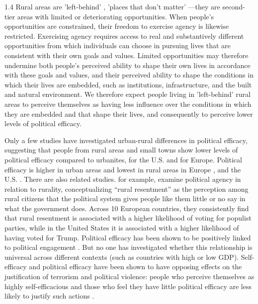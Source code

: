 \documentclass[10pt, letterpaper]{article}
\begin{document}
\begin{spacing}{1.4}
Rural areas are 'left-behind' \citep{ulrich2021people}, 'places that don't matter' \citep{rodriguez2018revenge}%
---they are second-tier areas with limited or deteriorating opportunities. 
When people's opportunities are constrained, their freedom to exercise agency is likewise restricted. Exercising agency requires access to real and substantively different opportunities from which individuals can choose in pursuing lives that are consistent with their own goals and values. Limited opportunities may therefore undermine both people's perceived ability to shape their own lives in
accordance with these goals and values, and their perceived ability to shape the conditions in which their lives are embedded, such as institutions, infrastructure, and the built and natural environment.
We therefore expect people living in 'left-behind' rural areas to perceive themselves as having less influence over the conditions in which they are embedded and that shape their lives, and consequently to perceive lower levels
of political efficacy. %
 
Only a few studies have investigated urban-rural differences in political efficacy, suggesting that people from rural areas and small towns show lower levels of political efficacy compared to urbanites, \citep[e.g.,][]{rowland2024political} for the U.S. and \citet[e.g.,][]{luukkonen2022urbanisation} for Europe.
Political efficacy is higher in urban areas and lowest in
rural areas in Europe \citep{garcia2024they,luukkonen2022urbanisation}, and the U.S. \citep{rowland2024political}.
There are also related studies. \citet{margalit2025cultural} %
for example, examine political agency in relation to rurality,
conceptualizing ``rural resentment'' as the perception among rural citizens that the political system gives people like them little or no say in what the government does. Across 10 European countries, they consistently find that rural resentment is associated with a higher likelihood of voting for populist parties, while in the United States it is associated with a higher likelihood of having voted for Trump.
%
Political efficacy has been shown to be positively linked to political engagement \citep{accetta23}. But no one has investigated whether this relationship is universal across
 different contexts (such as countries with high or low GDP). Self-efficacy and political efficacy have been shown to have opposing effects on the justification of terrorism and political violence: people who perceive themselves as highly self-efficacious and those who feel they have little political efficacy are less likely to justify such actions \citep{julkif2022self}.


\end{spacing}
\end{document}
